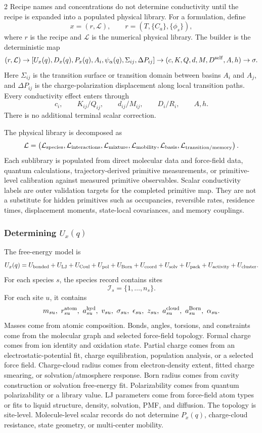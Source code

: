 \documentclass[10pt]{article}
\begin{document}
\begin{multicols}{2}
Recipe names and concentrations do not determine conductivity until the recipe
is expanded into a populated physical library. For a formulation, define
\[
x=(r,\mathcal L),
\qquad
r=(T,\{C_a\},\{\phi_s\}),
\]
where \(r\) is the recipe and \(\mathcal L\) is the numerical physical library.
The builder is the deterministic map
\[
(r,\mathcal L)
\rightarrow
\left[
U_x(q),D_x(q),P_x(q),A_i,\psi_\alpha(q),
\Sigma_{ij},\Delta P_{ij}
\right]
\rightarrow
(c,K,Q,d,M,D^{\rm self},A,h)
\rightarrow
\sigma.
\]
Here \(\Sigma_{ij}\) is the transition surface or transition domain between
basins \(A_i\) and \(A_j\), and \(\Delta P_{ij}\) is the charge-polarization
displacement along local transition paths. Every conductivity effect enters
through
\[
c_i,\qquad K_{ij}/Q_{ij},\qquad d_{ij}/M_{ij},\qquad D_i/R_i,\qquad A,h.
\]
There is no additional terminal scalar correction.

The physical library is decomposed as
\[
\mathcal L=
\left(
\mathcal L_{\rm species},
\mathcal L_{\rm interactions},
\mathcal L_{\rm mixture},
\mathcal L_{\rm mobility},
\mathcal L_{\rm basis},
\mathcal L_{\rm transition/memory}
\right).
\]
Each sublibrary is populated from direct molecular data and force-field data,
quantum calculations, trajectory-derived primitive measurements, or
primitive-level calibration against measured primitive observables. Scalar
conductivity labels are outer validation targets for the completed primitive
map. They are not a substitute for hidden primitives such as occupancies,
reversible rates, residence times, displacement moments, state-local
covariances, and memory couplings.

\subsubsection{Determining \(U_x(q)\)}

The free-energy model is
\[
U_x(q)=
U_{\rm bonded}
+U_{\rm LJ}
+U_{\rm Coul}
+U_{\rm pol}
+U_{\rm Born}
+U_{\rm coord}
+U_{\rm solv}
+U_{\rm pack}
+U_{\rm activity}
+U_{\rm cluster}.
\]
For each species \(s\), the species record contains sites
\[
\mathcal I_s=\{1,\ldots,n_s\}.
\]
For each site \(u\), it contains
\[
m_{su},\ r_{su}^{\rm atom},\ a_{su}^{\rm hyd},\ v_{su},\
\sigma_{su},\ \epsilon_{su},\ z_{su},\
a_{su}^{\rm cloud},\ a_{su}^{\rm Born},\ \alpha_{su}.
\]
Masses come from atomic composition. Bonds, angles, torsions, and constraints
come from the molecular graph and selected force-field topology. Formal charge
comes from ion identity and oxidation state. Partial charge comes from an
electrostatic-potential fit, charge equilibration, population analysis, or a
selected force field. Charge-cloud radius comes from electron-density extent,
fitted charge smearing, or solvation/atmosphere response. Born radius comes
from cavity construction or solvation free-energy fit. Polarizability comes
from quantum polarizability or a library value. LJ parameters come from
force-field atom types or fits to liquid structure, density, solvation, PMF,
and diffusion.
The topology is site-level. Molecule-level scalar records do not determine
\(P_x(q)\), charge-cloud resistance, state geometry, or multi-center mobility.


\end{multicols}
\end{document}
